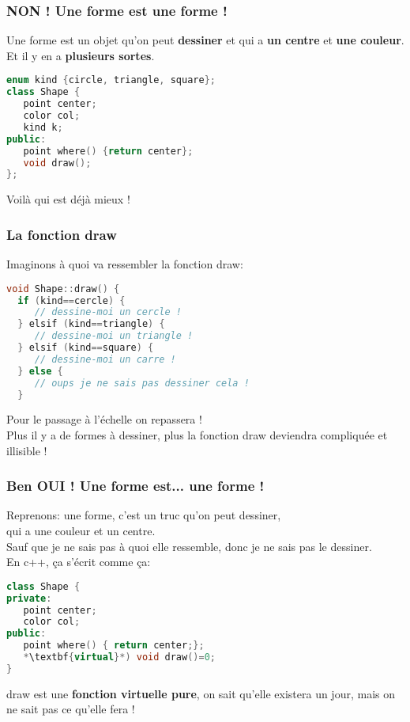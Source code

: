 \documentclass{beamer}
\begin{document}
\begin{frame}[fragile=singleslide,shrink=20]
\frametitle{NON ! Une forme est une forme !}
Une forme est un objet qu'on peut \textbf{dessiner} et qui a \textbf{un centre} et \textbf{une couleur}.\\
Et il y en a \textbf{plusieurs sortes}.
\begin{lstlisting}[language=c++]
enum kind {circle, triangle, square};
class Shape {
   point center;
   color col;
   kind k;
public:
   point where() {return center};
   void draw();
};
\end{lstlisting}
Voilà qui est déjà mieux ! 
\end{frame}

\begin{frame}[fragile=singleslide,shrink=20]
\frametitle{La fonction draw}
Imaginons à quoi va ressembler la fonction draw:
\begin{lstlisting}[language=c++]
void Shape::draw() {
  if (kind==cercle) {
     // dessine-moi un cercle !
  } elsif (kind==triangle) {
     // dessine-moi un triangle !
  } elsif (kind==square) {
     // dessine-moi un carre !
  } else {
     // oups je ne sais pas dessiner cela !
  }
\end{lstlisting}
Pour le passage à l'échelle on repassera ! \\
Plus il y a de formes à dessiner, plus la fonction draw deviendra compliquée et illisible !
\end{frame}
  
\begin{frame}[fragile=singleslide,shrink=20]
\frametitle{Ben OUI ! Une forme est... une forme !}
Reprenons: une forme, c'est un truc qu'on peut dessiner, \\ qui a une couleur et un centre. \\
Sauf que je ne sais pas à quoi elle ressemble, donc je ne sais pas le dessiner. \\
En c++, ça s'écrit comme ça:

\begin{lstlisting}[language=c++]
class Shape {
private:
   point center;
   color col;
public:
   point where() { return center;};
   *\textbf{virtual}*) void draw()=0;
}
\end{lstlisting}
draw est une \textbf{fonction virtuelle pure}, on sait qu'elle existera un jour, mais on ne sait pas ce qu'elle fera !
\end{frame}
\end{document}
